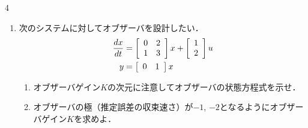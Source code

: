 


\begin{multicols}{4}
\begin{enumerate}

\item
次のシステムに対してオブザーバを設計したい．
\begin{align}
	\frac{dx}{dt}
	&=	\bmatrix{cc}
			0 & 2 \\
			1 & 3
		\ematrix
		x
		+
		\bmatrix{c}
			1 \\
			2 
		\ematrix
		u
\nonumber \\
	y 
	&=	\bmatrix{cc}
			0 & 1 
		\ematrix
		x
\nonumber 
\end{align}

\begin{enumerate}

\item 
オブザーバゲイン$K$の次元に注意してオブザーバの状態方程式を示せ．
\vspace{4cm}

\item
オブザーバの極（推定誤差の収束速さ）が$-1$, $-2$となるようにオブザーバゲイン$K$を求めよ．
\vspace{14cm}

\end{enumerate}



\end{enumerate}
\end{multicols}
